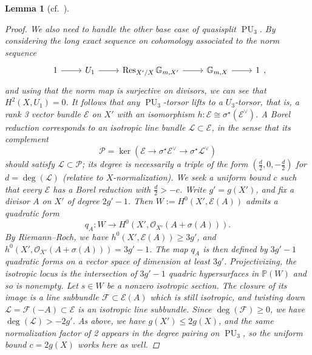 \documentclass[openany]{amsbook}
\newtheorem{lemma}[theorem]{Lemma}
\theoremstyle{definition}
\theoremstyle{remark}
\numberwithin{equation}{section}
\newcommand{\G}{\mathbb{G}}
\renewcommand{\O}{\mathcal{O}}
\newcommand{\cF}{\mathcal{F}}
\newcommand{\cL}{\mathcal{L}}
\newcommand{\cE}{\mathcal{E}}
\newcommand{\cP}{\mathcal{P}}
\renewcommand{\-}{\operatorname{-}}
\newcommand{\on}[1]{\operatorname{#1}}
\newcommand{\Res}{\on{Res}}
\begin{document}
\begin{lemma}[{{cf.\ \cite[Prop. 6.1.6]{CLI}}}]
\begin{proof}
        We also need to handle the other base case of quasisplit $\on{PU}_3$. By considering the long exact sequence on cohomology associated to the norm sequence
        $$
            \begin{tikzcd}
                1 \ar[r] & U_1 \ar[r] & \Res_{X'/X} \G_{m, X'} \ar[r] & \G_{m, X} \ar[r] & 1
            \end{tikzcd},
        $$
        and using that the norm map is surjective on divisors, we can see that $H^2(X, U_1) = 0$. It follows that any $\on{PU}_3$-torsor lifts to a $U_3$-torsor, that is, a rank 3 vector bundle $\cE$ on $X'$ with an isomorphism $h : \cE \cong \sigma^\star(\cE^\vee)$. A Borel reduction corresponds to an isotropic line bundle $\cL \subset \cE$, in the sense that its complement $$\cP = \ker(\cE \to \sigma^\star \cE^{\vee} \to \sigma^\star \cL^{\vee})$$ should satisfy $\cL \subset \cP$; its degree is necessarily a triple of the form $\left(\frac{d}{2}, 0, -\frac{d}{2}\right)$ for $d = \deg(\cL)$ (relative to $X$-normalization). We seek a uniform bound $c$ such that every $\cE$ has a Borel reduction with $\frac{d}{2} > - c$. Write $g' = g(X')$, and fix a divisor $A$ on $X'$ of degree $2g' - 1$. Then $W := H^0(X', \cE(A))$ admits a quadratic form 
        $$
            q_A : W \to H^0(X', \O_{X'}(A + \sigma(A))).
        $$
        By Riemann--Roch, we have $h^0(X', \cE(A)) \ge 3g'$, and $h^0(X', \O_{X'}(A + \sigma(A))) = 3g' - 1$. The map $q_A$ is then defined by $3g' - 1$ quadratic forms on a vector space of dimension at least $3g'$. Projectivizing, the isotropic locus is the intersection of $3g' - 1$ quadric hypersurfaces in $\mathbb{P}(W)$ and so is nonempty. Let $s \in W$ be a nonzero isotropic section. The closure of its image is a line subbundle $\cF \subset \cE(A)$ which is still isotropic, and twisting down $\cL = \cF(-A) \subset \cE$ is an isotropic line subbundle. Since $\deg(\cF) \ge 0$, we have $\deg(\cL) > - 2g'$. As above, we have $g(X') \le 2g(X)$, and the same normalization factor of 2 appears in the degree pairing on $\on{PU}_3$, so the uniform bound $c = 2g(X)$ works here as well. 
        

\end{proof}
\end{lemma}
\end{document}
